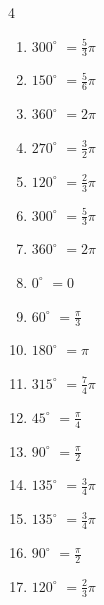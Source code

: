 \begin{multicols}{4}
\begin{enumerate}
  \item $\displaystyle 300^{\circ}$
        $\displaystyle =\frac{5}{3}\pi$

  \item $\displaystyle 150^{\circ}$
        $\displaystyle =\frac{5}{6}\pi$

  \item $\displaystyle 360^{\circ}$
        $\displaystyle =2\pi$

  \item $\displaystyle 270^{\circ}$
        $\displaystyle =\frac{3}{2}\pi$

  \item $\displaystyle 120^{\circ}$
        $\displaystyle =\frac{2}{3}\pi$

  \item $\displaystyle 300^{\circ}$
        $\displaystyle =\frac{5}{3}\pi$

  \item $\displaystyle 360^{\circ}$
        $\displaystyle =2\pi$

  \item $\displaystyle 0^{\circ}$
        $\displaystyle =0$

  \item $\displaystyle 60^{\circ}$
        $\displaystyle =\frac{\pi}{3}$

  \item $\displaystyle 180^{\circ}$
        $\displaystyle =\pi$

  \item $\displaystyle 315^{\circ}$
        $\displaystyle =\frac{7}{4}\pi$

  \item $\displaystyle 45^{\circ}$
        $\displaystyle =\frac{\pi}{4}$

  \item $\displaystyle 90^{\circ}$
        $\displaystyle =\frac{\pi}{2}$

  \item $\displaystyle 135^{\circ}$
        $\displaystyle =\frac{3}{4}\pi$

  \item $\displaystyle 135^{\circ}$
        $\displaystyle =\frac{3}{4}\pi$

  \item $\displaystyle 90^{\circ}$
        $\displaystyle =\frac{\pi}{2}$

  \item $\displaystyle 120^{\circ}$
        $\displaystyle =\frac{2}{3}\pi$


\end{enumerate}
\end{multicols}
